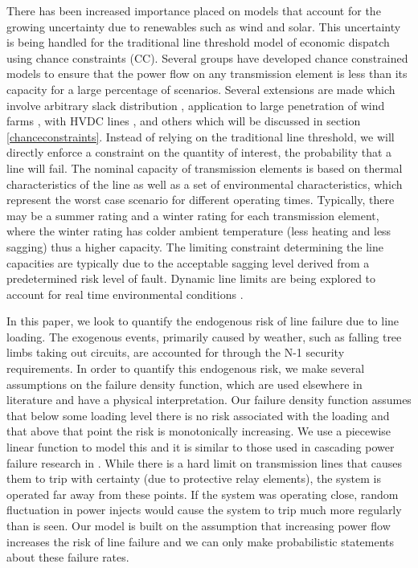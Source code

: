 There has been increased importance placed on models that account for the growing uncertainty due to renewables such as wind and solar.  This uncertainty is being  handled for the traditional line threshold model of economic dispatch using chance constraints (CC).  Several groups have developed chance constrained models to ensure that the power flow on any transmission element is less than its capacity for a large percentage of scenarios.  Several extensions are made which involve arbitrary slack distribution \cite{bienstock_2012}, application to large penetration of wind farms \cite{vrakopoulou_2013b}, with HVDC lines \cite{vrakopoulou_2013}, and others \cite{roald_2013,vrakopoulou_2013c} which will be discussed in section \ref{chanceconstraints}.  Instead of relying on the traditional line threshold, we will directly enforce a constraint on the quantity of interest, the probability that a line will fail. The nominal capacity of transmission elements is based on thermal characteristics of the line as well as a set of environmental characteristics, which represent the worst case scenario for different operating times.  Typically, there may be a summer rating and a winter rating for each transmission element, where the winter rating has colder ambient temperature (less heating and less sagging) thus a higher capacity.  The limiting constraint determining the line capacities are typically due to the acceptable sagging level derived from a predetermined risk level of fault\cite{seppa_2007}.  Dynamic line limits are being explored to account for real time environmental conditions \cite{bucher_2013,wang_2011,yip_2009,zhang_2002}.  

In this paper, we look to quantify the endogenous risk of line failure due to line loading.  The exogenous events, primarily caused by weather, such as falling tree limbs taking out circuits, are accounted for through the N-1 security requirements.  In order to quantify this endogenous risk, we make several assumptions on the failure density function, which are used elsewhere in literature and have a physical interpretation.  Our failure density function assumes that below some loading level there is no risk associated with the loading and that above that point the risk is monotonically increasing.  We use a piecewise linear function to model this and it is similar to those used in cascading power failure research in \cite{carreras_2002,chen_2005,dobson_2007,hines_2011,newman_2011}.  While there is a hard limit on transmission lines that causes them to trip with certainty (due to protective relay elements), the system is operated far away from these points.  If the system was operating close, random fluctuation in power injects would cause the system to trip much more regularly than is seen.  Our model is built on the assumption that increasing power flow increases the risk of line failure and we can only make probabilistic statements about these failure rates. 


